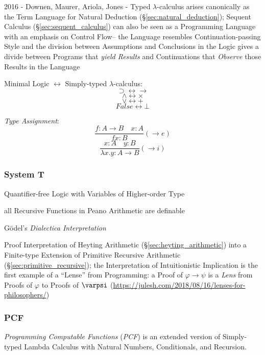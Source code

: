 2016 - Downen, Maurer, Ariola, Jones - Typed $\lambda$-calculus arises
canonically as the Term Language for Natural Deduction
(\S\ref{sec:natural_deduction}); Sequent Calculus
(\S\ref{sec:sequent_calculus}) can also be seen as a Programming Language with
an emphasis on Control Flow-- the Language resembles Continuation-passing Style
and the division between Assumptions and Conclusions in the Logic gives a
divide between Programs that \emph{yield Results} and Continuations that
\emph{Observe} those Results in the Language


Minimal Logic $\leftrightarrow$ Simply-typed $\lambda$-calculus:
\[
  \supset \leftrightarrow \rightarrow
\] \[
  \wedge \leftrightarrow \times
\] \[
  \vee \leftrightarrow +
\] \[
  False \leftrightarrow \bot
\]



\emph{Type Assignment}:
\[
  \frac{
    f:A \rightarrow B \quad x:A
  }{
    f x : B
  }(\rightarrow e)
\]\[
  \frac{
    x:A \quad y:B
  }{
    \lambda x.y : A \rightarrow B
  }(\rightarrow i)
\]



\subsubsection{System T}\label{sec:system_t}

Quantifier-free Logic with Variables of Higher-order Type

all Recursive Functions in Peano Arithmetic are definable

G\"odel's \emph{Dialectica Interpretation}

Proof Interpretation of Heyting Arithmetic (\S\ref{sec:heyting_arithmetic}) into
a Finite-type Extension of Primitive Recursive Arithmetic
(\S\ref{sec:primitive_recursive});
the Interpretation of Intuitionistic Implication
is the first example of a ``Lense'' from
Programming: a Proof of $\varphi \rightarrow \psi$ is a \emph{Lens} from Proofs
of $\varphi$ to Proofs of $\varpsi$
(\url{https://julesh.com/2018/08/16/lenses-for-philosophers/})



\subsubsection{PCF}\label{sec:pcf}

\emph{Programming Computable Functions} (\emph{PCF}) is an extended
version of Simply-typed Lambda Calculus with Natural Numbers,
Conditionals, and Recursion.

